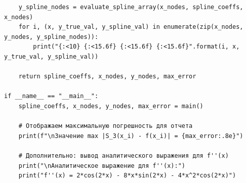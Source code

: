 \documentclass[12pt]{article}
\begin{document}
\begin{verbatim}
    y_spline_nodes = evaluate_spline_array(x_nodes, spline_coeffs, x_nodes)
    for i, (x, y_true_val, y_spline_val) in enumerate(zip(x_nodes, y_nodes, y_spline_nodes)):
        print("{:<10} {:<15.6f} {:<15.6f} {:<15.6f}".format(i, x, y_true_val, y_spline_val))
    
    return spline_coeffs, x_nodes, y_nodes, max_error

if __name__ == "__main__":
    spline_coeffs, x_nodes, y_nodes, max_error = main()
    
    # Отображаем максимальную погрешность для отчета
    print(f"\nЗначение max |S_3(x_i) - f(x_i)| = {max_error:.8e}")
    
    # Дополнительно: вывод аналитического выражения для f''(x)
    print("\nАналитическое выражение для f''(x):")
    print("f''(x) = 2*cos(2*x) - 8*x*sin(2*x) - 4*x^2*cos(2*x)")
\end{verbatim}
\end{document}
